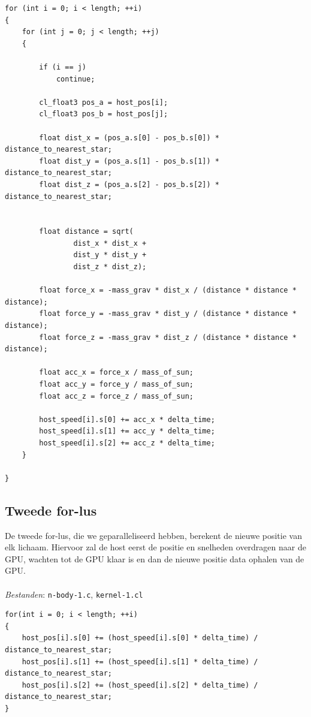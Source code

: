 \documentclass{article}
\begin{document}
\begin{lstlisting}[caption={De eerste for-lus}, label={code:for1}, breaklines=true, basicstyle=\footnotesize]
for (int i = 0; i < length; ++i)
{
    for (int j = 0; j < length; ++j)
    {

        if (i == j)
            continue;

        cl_float3 pos_a = host_pos[i];
        cl_float3 pos_b = host_pos[j];

        float dist_x = (pos_a.s[0] - pos_b.s[0]) * distance_to_nearest_star;
        float dist_y = (pos_a.s[1] - pos_b.s[1]) * distance_to_nearest_star;
        float dist_z = (pos_a.s[2] - pos_b.s[2]) * distance_to_nearest_star;


        float distance = sqrt(
                dist_x * dist_x +
                dist_y * dist_y +
                dist_z * dist_z);

        float force_x = -mass_grav * dist_x / (distance * distance * distance);
        float force_y = -mass_grav * dist_y / (distance * distance * distance);
        float force_z = -mass_grav * dist_z / (distance * distance * distance);

        float acc_x = force_x / mass_of_sun;
        float acc_y = force_y / mass_of_sun;
        float acc_z = force_z / mass_of_sun;

        host_speed[i].s[0] += acc_x * delta_time;
        host_speed[i].s[1] += acc_y * delta_time;
        host_speed[i].s[2] += acc_z * delta_time;
    }

}
\end{lstlisting}

\subsection{Tweede for-lus}
\label{hfd:niet-atomisch-for2}
De tweede for-lus, die we geparalleliseerd hebben, berekent de nieuwe positie
van elk lichaam. Hiervoor zal de host eerst de positie en snelheden overdragen
naar de GPU, wachten tot de GPU klaar is en dan de nieuwe positie data ophalen
van de GPU.
\\
\\
\textit{Bestanden}: \texttt{n-body-1.c}, \texttt{kernel-1.cl}

\begin{lstlisting}[caption={De tweede for-lus}, label={code:for2}, breaklines=true, basicstyle=\footnotesize]
for(int i = 0; i < length; ++i)
{
    host_pos[i].s[0] += (host_speed[i].s[0] * delta_time) / distance_to_nearest_star;
    host_pos[i].s[1] += (host_speed[i].s[1] * delta_time) / distance_to_nearest_star;
    host_pos[i].s[2] += (host_speed[i].s[2] * delta_time) / distance_to_nearest_star;
}
\end{lstlisting}
\end{document}

